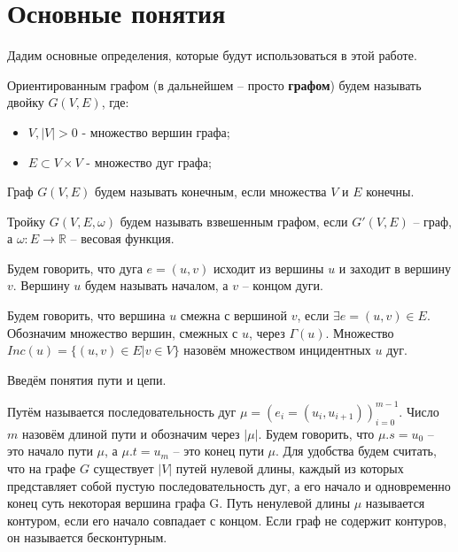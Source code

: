 \section{Основные понятия}
Дадим основные определения, которые будут использоваться в этой работе.

\begin{defn}
	Ориентированным графом (в дальнейшем -- просто \textbf{графом}) будем называть двойку $G (V, E)$, где:
	\begin{itemize}
		\item $V, |V|>0$ - множество вершин графа;
		\item $E \subset V \times V$ - множество дуг графа;
	\end{itemize}
\end{defn}
\begin{defn}
	Граф $G(V, E)$ будем называть конечным, если множества $V$ и $E$ конечны.
\end{defn}
\begin{defn}
	Тройку $G(V, E, \omega)$ будем называть взвешенным графом, если $G'(V, E)$ -- граф, а $\omega : E \to \mathbb{R}$ -- весовая функция.
\end{defn}
\begin{defn}
	Будем говорить, что дуга $e = (u, v)$ исходит из вершины $u$ и заходит в вершину $v$. Вершину $u$ будем называть началом, а $v$ -- концом дуги.
\end{defn} 
\begin{defn}
	Будем говорить, что вершина $u$ смежна с вершиной $v$, если $\exists e = (u,v) \in E$. Обозначим множество вершин, смежных с $u$, через $\Gamma(u)$. Множество $Inc(u) = \{(u, v) \in E | v \in V \}$ назовём множеством инцидентных $u$ дуг.
\end{defn} 

Введём понятия пути и цепи.

\begin{defn}
	Путём называется последовательность дуг $\mu = (e_i = (u_i, u_{i+1}))_{i = 0}^{m-1}$. Число $m$ назовём длиной пути и обозначим через $|\mu|$. Будем говорить, что $\mu.s = u_0$ -- это начало пути $\mu$, а $\mu.t = u_m$ -- это конец пути $\mu$. Для удобства будем считать, что на графе $G$ существует $|V|$ путей нулевой длины, каждый из которых представляет собой пустую последовательность дуг, а его начало и одновременно конец суть некоторая вершина графа G. Путь ненулевой длины $\mu$ называется контуром, если его начало совпадает с концом. Если граф не содержит контуров, он называется бесконтурным.
\end{defn} 

